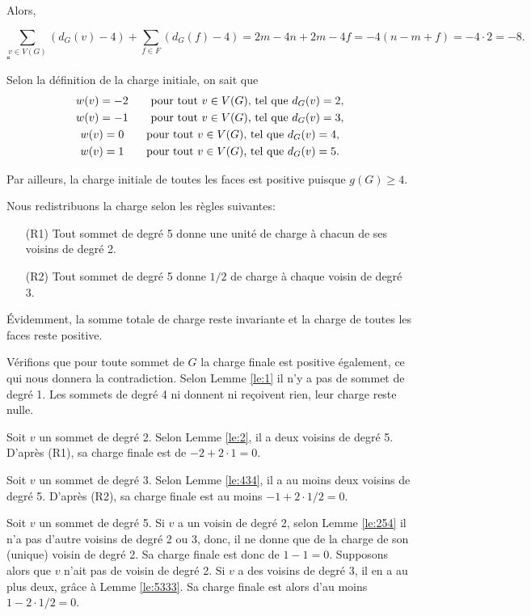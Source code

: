 \documentclass[10pt,a4paper]{article}
\newcommand{\ep}{{\hfill $\square$}}
\begin{document}
Alors,

$$ \sum_{v \in V(G)} (d_G(v) - 4) + \sum_{f\in F} (d_G(f) -4) = 2m -4n + 2m - 4f = -4(n - m + f) = -4\cdot 2 = -8.$$
\ep 

Selon la définition de la charge initiale, on sait que
$$ 
\gathered
w(v) = -2 \qquad \textrm{pour tout $v \in V(G)$, tel que } d_G(v) = 2, \\
w(v) = -1 \qquad \textrm{pour tout $v \in V(G)$, tel que } d_G(v) = 3, \\
w(v) =  0 \qquad \textrm{pour tout $v \in V(G)$, tel que } d_G(v) = 4, \\
w(v) =  1 \qquad \textrm{pour tout $v \in V(G)$, tel que } d_G(v) = 5.
\endgathered
$$

Par ailleurs, la charge initiale de toutes les faces est positive puisque $g(G)\ge 4$.

Nous redistribuons la charge selon les règles suivantes:
\begin{enumerate}
\item[(R1)] Tout sommet de degré 5 donne une unité de charge à chacun de ses voisins de degré 2.
\item[(R2)] Tout sommet de degré 5 donne $1/2$ de charge à chaque voisin de degré 3.
\end{enumerate}

Évidemment, la somme totale de charge reste invariante et la charge de toutes les faces reste positive.

Vérifions que pour toute sommet de $G$ la charge finale est positive également, ce qui nous donnera la contradiction.
Selon Lemme \ref{le:1} il n'y a pas de sommet de degré 1.
Les sommets de degré 4 ni donnent ni reçoivent rien, leur charge reste nulle.

Soit $v$ un sommet de degré 2. Selon Lemme \ref{le:2}, il a deux voisins de degré 5. D'après (R1), sa charge finale est de $-2 + 2\cdot 1=0$.

Soit $v$ un sommet de degré 3. Selon Lemme \ref{le:434}, il a au moins deux voisins de degré 5. D'après (R2), sa charge finale est au moins $-1 + 2\cdot 1/2 = 0$.

Soit $v$ un sommet de degré 5. Si $v$ a un voisin de degré 2, selon Lemme \ref{le:254} il n'a pas d'autre voisins de degré 2 ou 3, donc, il ne donne que de la charge de son (unique) voisin de degré 2. Sa charge finale est donc de $1-1=0$.
Supposons alors que $v$ n'ait pas de voisin de degré 2. Si $v$ a des voisins de degré 3, il en a au plus deux, grâce à Lemme \ref{le:5333}. Sa charge finale est alors d'au moins $1-2\cdot 1/2 = 0$. 
\end{document}
